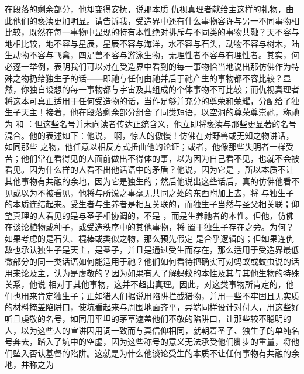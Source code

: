 在段落的剩余部分，他却变得安抚，说那本质  仇视真理者献给主这样的礼物，由此他们的亵渎更加明显。请告诉我，受造界中还有什么事物容许与另一不同事物相比较，既然在每一事物中显现的特有本性绝对排斥与不同类的事物共融？天不容与地相比较，地不容与星辰，星辰不容与海洋，水不容与石头，动物不容与树木，陆生动物不容与飞禽，四足兽不容与游泳生物，无理性者不容与有理性者。其实，何必逐一举例，表明我们可以对在受造界中看到的每一事物恰当地说出那仿佛作为特殊之物扔给独生子的话——即祂与任何由祂并后于祂产生的事物都不容比较？显然，你独自设想的每一事物都与宇宙及其组成的个体事物不可比较；而仇视真理者将这本可真正适用于任何受造物的话，当作足够并充分的尊荣和荣耀，分配给了独生子天主！接着，他在段落剩余部分组合了同类短语，以空洞的尊荣尊崇祂，称祂为  和 ：但这些名号并未向读者传达正统含义，他立即将亵渎与那些更显著的名号混合。他的表述如下：他说， 啊，惊人的傲慢！仿佛在对野兽或无知之物讲话，如同那些  之物，他任意以相反方式扭曲他的论证；或者，他像那些失明者一样受苦；他们常在看得见的人面前做出不得体的事，以为因为自己看不见，也就不会被看见。因为什么样的人看不出他话语中的矛盾？他说，因为它是 ，所以本质不让其他事物有共融的余地，因为它是独生的；然后他说出这些话后，真的仿佛他看不见或以为不被看见，他将与所说之事毫无共同之处的东西附加上去，将  与独生子的本质连结起来。受生者与生养者是相互关联的，而独生子当然与圣父相关联；仰望真理的人看见的是与圣子相协调的，不是 ，而是生养祂者的本性。但他，仿佛在谈论植物或种子，或受造秩序中的其他事物，将  置于独生子存在之旁。为何？如果考虑的是石头、棍棒或类似之物，那么预先假定  是合乎逻辑的；但如果连仇敌也承认独生子是天主，是圣子，并且是通过受生而存在，那么适用于受造界最低微部分的同一类话语如何能适用于祂？他们如何看待把确实可对蚂蚁或蚊虫说的话用来论及主，认为是虔敬的？因为如果有人了解蚂蚁的本性及其与其他生物的特殊关系，他说  相对于其他事物，这并不超出真理。因此，对这类事物所肯定的，他们也用来肯定独生子；正如猎人们据说用陷阱拦截猎物，并用一些不牢固且无实质的材料掩盖陷阱口，使坑看起来与周围地面齐平，异端同样设计对付人，用这些好听且虔敬的名号，如同用平坦的茅草遮盖他们不敬的陷阱口，让那些较不聪明的人，以为这些人的宣讲因用词一致而与真信仰相同，就朝着圣子、独生子的单纯名号奔去，踏入了坑中的空虚，因为这些称号的意义无法承受他们脚步的重量，将他们坠入否认基督的陷阱。这就是为什么他谈论受生的本质不让任何事物有共融的余地，并称之为 